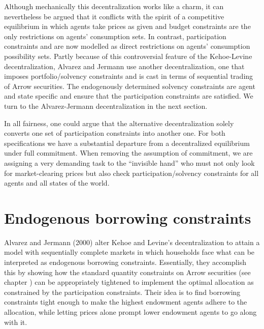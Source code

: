   Although mechanically this decentralization  works like a charm, it
can nevertheless
be argued that it conflicts with the
spirit of a competitive equilibrium in which agents take prices
as given and budget constraints are the only restrictions on agents'
consumption sets. In contrast,
participation constraints  and 
are now modelled as direct restrictions on agents' consumption possibility sets.
Partly because of this controversial feature of the
Kehoe-Levine decentralization,
Alvarez and Jermann use another  decentralization, one that
imposes portfolio/solvency constraints and is cast in terms of sequential
trading of Arrow securities.
%
The endogenously determined solvency constraints are agent and
state specific and ensure that the participation constraints are
satisfied. We turn to the Alvarez-Jermann decentralization in the next section.


In all fairness, one could argue that the alternative decentralization solely
converts one set of participation constraints into another one.
For both specifications we have a substantial departure from a decentralized
equilibrium under full commitment. When
removing the assumption of commitment, we are assigning a very demanding
task to the ``invisible hand'' who must not only look for market-clearing
prices but also check participation/solvency
constraints for all agents and all states of the world.


\section{Endogenous borrowing constraints}
Alvarez and Jermann (2000) alter Kehoe and Levine's
decentralization to attain a model with sequentially complete
markets in which households face what can be interpreted as
endogenous borrowing constraints.
%
Essentially, they accomplish this by showing how the standard
quantity constraints on Arrow securities (see chapter
) can be appropriately tightened  to implement the
optimal allocation as constrained by the participation
constraints.  Their idea is to find borrowing constraints tight
enough to make the highest endowment agents adhere to the
allocation, while letting prices alone prompt lower endowment
agents to go along with it.   

